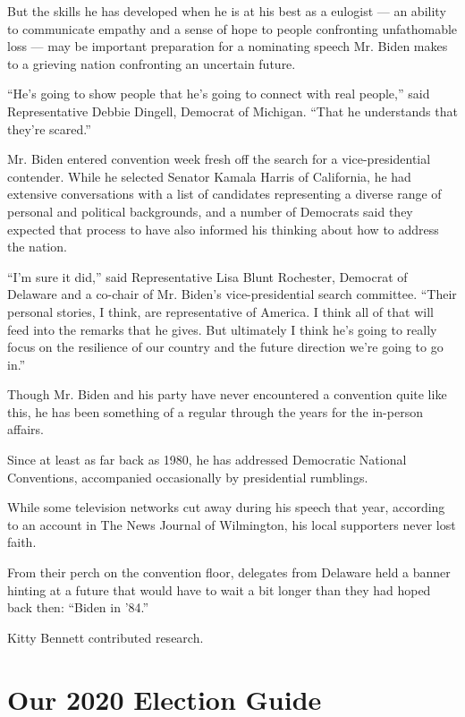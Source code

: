 But the skills he has developed when he is at his best as a eulogist ---
an ability to communicate empathy and a sense of hope to people
confronting unfathomable loss --- may be important preparation for a
nominating speech Mr. Biden makes to a grieving nation confronting an
uncertain future.

``He's going to show people that he's going to connect with real
people,'' said Representative Debbie Dingell, Democrat of Michigan.
``That he understands that they're scared.''

Mr. Biden entered convention week fresh off the search for a
vice-presidential contender. While he selected Senator Kamala Harris of
California, he had extensive conversations with a list of candidates
representing a diverse range of personal and political backgrounds, and
a number of Democrats said they expected that process to have also
informed his thinking about how to address the nation.

``I'm sure it did,'' said Representative Lisa Blunt Rochester, Democrat
of Delaware and a co-chair of Mr. Biden's vice-presidential search
committee. ``Their personal stories, I think, are representative of
America. I think all of that will feed into the remarks that he gives.
But ultimately I think he's going to really focus on the resilience of
our country and the future direction we're going to go in.''

Though Mr. Biden and his party have never encountered a convention quite
like this, he has been something of a regular through the years for the
in-person affairs.

Since at least as far back as 1980, he has addressed Democratic National
Conventions, accompanied occasionally by presidential rumblings.

While some television networks cut away during his speech that year,
according to an account in The News Journal of Wilmington, his local
supporters never lost faith.

From their perch on the convention floor, delegates from Delaware held a
banner hinting at a future that would have to wait a bit longer than
they had hoped back then: ``Biden in '84.''

Kitty Bennett contributed research.

\hypertarget{our-2020-election-guide}{%
\section{Our 2020 Election Guide}\label{our-2020-election-guide}}

